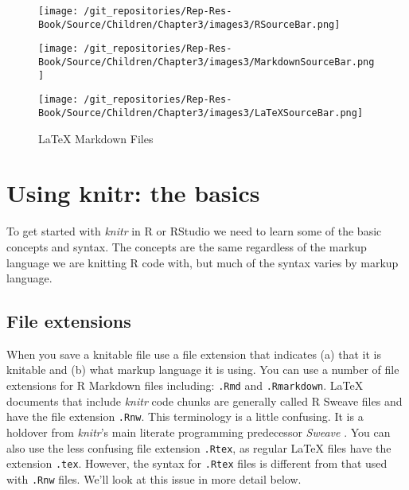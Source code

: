 \begin{figure}[ht]
    \caption{RStudio Source Code Pane Top Bars}
    \label{SourcePanes}
    \begin{center}
    
        \begin{subfigure}
            \caption{R Source Code}
            \texttt{[image: /git\_repositories/Rep-Res-Book/Source/Children/Chapter3/images3/RSourceBar.png]}
        \end{subfigure}
        \vspace{0.5cm}
        
        \begin{subfigure}
            \caption{R Markdown Files}
            \texttt{[image: /git\_repositories/Rep-Res-Book/Source/Children/Chapter3/images3/MarkdownSourceBar.png]}
        \end{subfigure}
        \vspace{0.5cm}
        
        \begin{subfigure}
            \caption{LaTeX Markdown Files}
            \texttt{[image: /git\_repositories/Rep-Res-Book/Source/Children/Chapter3/images3/LaTeXSourceBar.png]}
        \end{subfigure}
        
    \end{center}
\end{figure}



\section{Using knitr: the basics}

To get started with {\emph{knitr}} in R or RStudio we need to learn some of the basic concepts and syntax. The concepts are the same regardless of the markup language we are knitting R code with, but much of the syntax varies by markup language.

\subsection{File extensions}

When you save a knitable file use a file extension that indicates (a) that it is knitable and (b) what markup language it is using. You can use a number of file extensions for R Markdown files including: \texttt{.Rmd} and \texttt{.Rmarkdown}. LaTeX documents that include {\emph{knitr}} code chunks are generally called R Sweave files and have the file extension {\tt{.Rnw}}. This terminology is a little confusing. It is a holdover from {\emph{knitr}}'s main literate programming predecessor {\emph{Sweave}} \cite[]{Leisch2002}. You can also use the less confusing file extension \texttt{.Rtex}, as regular LaTeX files have the extension \texttt{.tex}. However, the syntax for \texttt{.Rtex} files is different from that used with \texttt{.Rnw} files. We'll look at this issue in more detail below.

